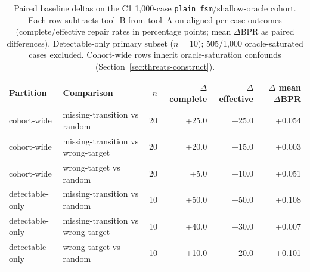\begin{table}[t]
\caption{Paired baseline deltas on the C1 1{,}000-case \texttt{plain\_fsm}/shallow-oracle cohort. Each row subtracts tool~B from tool~A on aligned per-case outcomes (complete/effective repair rates in percentage points; mean $\Delta$BPR as paired differences). Detectable-only primary subset ($n=10$); 505/1{,}000 oracle-saturated cases excluded. Cohort-wide rows inherit oracle-saturation confounds (Section~\ref{sec:threats-construct}).}
\label{tab:baseline-delta-summary}
\begin{tabular}{@{}llrrrr@{}}
\toprule
Partition & Comparison & $n$ & $\Delta$ complete & $\Delta$ effective & $\Delta$ mean $\Delta$BPR \\
\midrule
cohort-wide & missing-transition vs random & 20 & +25.0 & +25.0 & +0.054 \\
cohort-wide & missing-transition vs wrong-target & 20 & +20.0 & +15.0 & +0.003 \\
cohort-wide & wrong-target vs random & 20 & +5.0 & +10.0 & +0.051 \\
detectable-only & missing-transition vs random & 10 & +50.0 & +50.0 & +0.108 \\
detectable-only & missing-transition vs wrong-target & 10 & +40.0 & +30.0 & +0.007 \\
detectable-only & wrong-target vs random & 10 & +10.0 & +20.0 & +0.101 \\
\bottomrule
\end{tabular}
\end{table}
